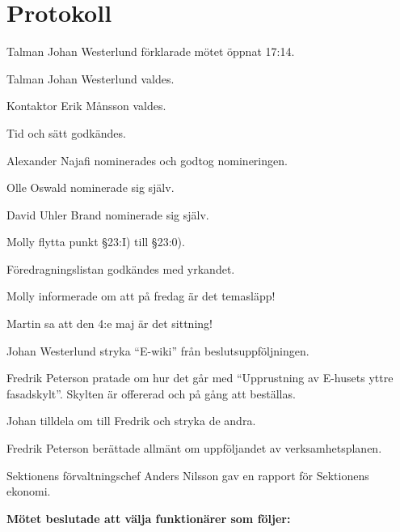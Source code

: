 \documentclass[10pt]{article}
\def\mo{Johan Westerlund}
\def\ms{Erik Månsson}
\begin{document}
\section*{Protokoll}
\begin{paragrafer}
Talman {\mo} förklarade mötet öppnat 17:14.

Talman {\mo} valdes.

Kontaktor {\ms} valdes.

Tid och sätt godkändes.

Alexander Najafi nominerades och godtog nomineringen.

Olle Oswald nominerade sig själv.

David Uhler Brand nominerade sig själv.

\valavj

\ingaadj

Molly \ypa flytta punkt \S23:I) till \S23:0).

Föredragningslistan godkändes med yrkandet.


Molly informerade om att på fredag är det temasläpp!

Martin sa att den 4:e maj är det sittning!


Johan Westerlund \ypa stryka ``E-wiki'' från beslutsuppföljningen.

Fredrik Peterson pratade om hur det går med ``Upprustning av E-husets yttre fasadskylt''. Skylten är offererad och på gång att beställas.

Johan \ypa tilldela om till Fredrik och stryka de andra. %


Fredrik Peterson berättade allmänt om uppföljandet av verksamhetsplanen.

Sektionens förvaltningschef Anders Nilsson gav en rapport för Sektionens ekonomi.

\begin{paragrafer}
    \textbf{Mötet beslutade att välja funktionärer som följer:}
\end{paragrafer}
\end{paragrafer}
\end{document}
